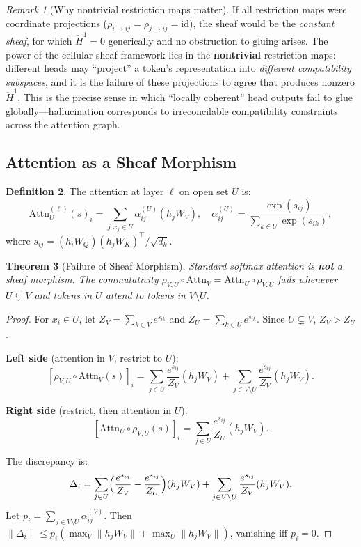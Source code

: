 \documentclass[11pt,a4paper]{article}
\theoremstyle{plain}
\newtheorem{theorem}{Theorem}[section]
\theoremstyle{definition}
\newtheorem{definition}[theorem]{Definition}
\theoremstyle{remark}
\newtheorem{remark}[theorem]{Remark}
\newcommand{\Attn}{\mathrm{Attn}}
\newcommand{\CechH}{\check{H}}
\begin{document}
\begin{remark}[Why nontrivial restriction maps matter]\label{rem:nontrivial-sheaf}
If all restriction maps were coordinate projections ($\rho_{i \to ij} = \rho_{j \to ij} = \mathrm{id}$), the sheaf would be the \emph{constant sheaf}, for which $\CechH^1 = 0$ generically and no obstruction to gluing arises. The power of the cellular sheaf framework lies in the \textbf{nontrivial} restriction maps: different heads may ``project'' a token's representation into \emph{different compatibility subspaces}, and it is the failure of these projections to agree that produces nonzero $\CechH^1$. This is the precise sense in which ``locally coherent'' head outputs fail to glue globally---hallucination corresponds to irreconcilable compatibility constraints across the attention graph.
\end{remark}

\subsection{Attention as a Sheaf Morphism}\label{sec:attn-morphism}

\begin{definition}\label{def:attn-morphism}
The attention at layer $\ell$ on open set $U$ is:
\[
\Attn_U^{(\ell)}(s)_i = \sum_{j: x_j \in U} \alpha_{ij}^{(U)} (h_j W_V), \quad
\alpha_{ij}^{(U)} = \frac{\exp(s_{ij})}{\sum_{k \in U} \exp(s_{ik})},
\]
where $s_{ij} = (h_i W_Q)(h_j W_K)^\top / \sqrt{d_k}$.
\end{definition}

\begin{theorem}[Failure of Sheaf Morphism]\label{thm:softmax-failure}
Standard softmax attention is \textbf{not} a sheaf morphism. The commutativity $\rho_{V,U} \circ \Attn_V = \Attn_U \circ \rho_{V,U}$ fails whenever $U \subsetneq V$ and tokens in $U$ attend to tokens in $V \setminus U$.
\end{theorem}

\begin{proof}
For $x_i \in U$, let $Z_V = \sum_{k \in V} e^{s_{ik}}$ and $Z_U = \sum_{k \in U} e^{s_{ik}}$. Since $U \subsetneq V$, $Z_V > Z_U$.

\textbf{Left side} (attention in $V$, restrict to $U$):
\[
[\rho_{V,U} \circ \Attn_V(s)]_i = \sum_{j \in U} \frac{e^{s_{ij}}}{Z_V}(h_j W_V) + \sum_{j \in V \setminus U} \frac{e^{s_{ij}}}{Z_V}(h_j W_V).
\]

\textbf{Right side} (restrict, then attention in $U$):
\[
[\Attn_U \circ \rho_{V,U}(s)]_i = \sum_{j \in U} \frac{e^{s_{ij}}}{Z_U}(h_j W_V).
\]

The discrepancy is:
\[
\Delta_i = \sum_{j \in U}\Bigl(\frac{e^{s_{ij}}}{Z_V} - \frac{e^{s_{ij}}}{Z_U}\Bigr)(h_j W_V) + \sum_{j \in V \setminus U} \frac{e^{s_{ij}}}{Z_V}(h_j W_V).
\]
Let $p_i = \sum_{j \in V \setminus U} \alpha_{ij}^{(V)}$. Then $\|\Delta_i\| \leq p_i(\max_V \|h_j W_V\| + \max_U \|h_j W_V\|)$, vanishing iff $p_i = 0$.
\end{proof}
\end{document}
